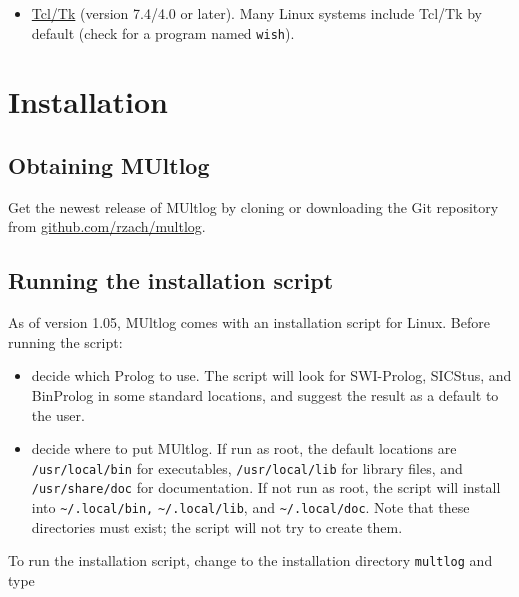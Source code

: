 \documentclass[]{article}
\providecommand{\tightlist}{%
  \setlength{\itemsep}{0pt}\setlength{\parskip}{0pt}}
\begin{document}
\begin{itemize}
\tightlist
\item
  \href{https://www.tcl.tk/}{Tcl/Tk} (version 7.4/4.0 or later). Many
  Linux systems include Tcl/Tk by default (check for a program named
  \texttt{wish}).
\end{itemize}

\hypertarget{installation}{%
\section{Installation}\label{installation}}

\hypertarget{obtaining-multlog}{%
\subsection{Obtaining MUltlog}\label{obtaining-multlog}}

Get the newest release of MUltlog by cloning or downloading the Git
repository from
\href{https://github.com/rzach/multlog}{github.com/rzach/multlog}.

\hypertarget{running-the-installation-script}{%
\subsection{Running the installation
script}\label{running-the-installation-script}}

As of version 1.05, MUltlog comes with an installation script for Linux.
Before running the script:

\begin{itemize}
\item
  decide which Prolog to use. The script will look for SWI-Prolog,
  SICStus, and BinProlog in some standard locations, and suggest the
  result as a default to the user.
\item
  decide where to put MUltlog. If run as root, the default locations are
  \texttt{/usr/local/bin} for executables, \texttt{/usr/local/lib} for
  library files, and \texttt{/usr/share/doc} for documentation. If not
  run as root, the script will install into
  \texttt{\textasciitilde{}/.local/bin,}
  \texttt{\textasciitilde{}/.local/lib}, and
  \texttt{\textasciitilde{}/.local/doc}. Note that these directories
  must exist; the script will not try to create them.
\end{itemize}

To run the installation script, change to the installation directory
\texttt{multlog} and type
\end{document}
